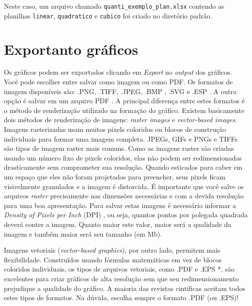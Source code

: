 \documentclass[
]{book}
\begin{document}
Neste caso, um arquivo chamado \texttt{quanti\_exemplo\_plan.xlsx} contendo as planilhas \texttt{linear}, \texttt{quadratico} e \texttt{cubico} foi criado no diretório padrão.

\hypertarget{exportanto-gruxe1ficos}{%
\section{Exportanto gráficos}\label{exportanto-gruxe1ficos}}

Os gráficos podem ser exportados clicando em \emph{Export}  no \emph{output} dos gráficos. Você pode escolher entre salvar como imagem ou como PDF. Os formatos de imagem disponíveis são: .PNG, .TIFF, .JPEG, .BMP , .SVG  e .ESP . A outra opção é salvar em um arquivo PDF . A principal diferença entre estes formatos é o método de renderização utilizado na formação do gráfico. Existem basicamente dois métodos de renderização de imagens: \emph{raster images} e \emph{vector-based images}. Imagens rasterizadas usam muitos pixels coloridos ou blocos de construção individuais para formar uma imagem completa. JPEGs, GIFs e PNGs e TIFFs são tipos de imagem raster mais comuns. Como as imagens raster são criadas usando um número fixo de pixels coloridos, elas não podem ser redimensionadas drasticamente sem comprometer sua resolução. Quando esticados para caber em um espaço que eles não foram projetados para preencher, seus pixels ficam visivelmente granulados e a imagem é distorcida. É importante que você salve os arquivos \emph{raster} precisamente nas dimensões necessárias e com a devida resolução para uma boa apresentação. Para salvar estas imagens é necessário informar a \emph{Density of Pixels per Inch} (DPI) , ou seja, quantos pontos por polegada quadrada deverá conter a imagem. Quanto maior este valor, maior será a qualidade da imagem e também maior será seu tamanho (em Mb).

Imagens vetoriais (\emph{vector-based graphics}), por outro lado, permitem mais flexibilidade. Construídos usando fórmulas matemáticas em vez de blocos coloridos individuais, os tipos de arquivos vetoriais, como .PDF e .EPS *, são excelentes para criar gráficos de alta resolução sem que seu redimensionamento prejudique a qualidade do gráfico. A maioria das revistas cintíficas aceitam todos estes tipos de formatos. Na dúvida, escolha sempre o formato .PDF (ou .EPS)!
\end{document}
